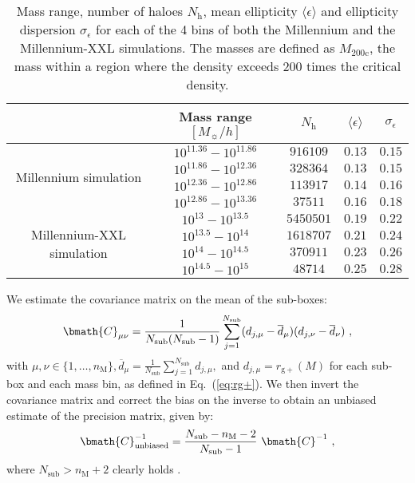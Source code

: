 \documentclass[a4paper,fleqn,usenatbib]{mnras}
\begin{document}
\begin{table}
	\centering
	\caption{Mass range, number of haloes $N_\mathrm{h}$, mean ellipticity $\langle \epsilon \rangle$ and ellipticity dispersion $\sigma_{\epsilon}$ for each of the 4 bins of both the Millennium and the Millennium-XXL simulations. The masses are defined as $M_{200\mathrm{c}}$, the mass within a region where the density exceeds 200 times the critical density.}
	\label{tab:bins}
	\tabcolsep=0.09cm
	\begin{tabular}{c||cccc} %
		\hline \hline
		\ & Mass range $[M_{\sun}/h]$ & $N_\mathrm{h}$ & $\langle \epsilon \rangle$ &  $\sigma_{\epsilon}$  \\
		\hline
		\multirow{4}{*}{Millennium simulation} & $10^{11.36}-10^{11.86}$ & $916109$ &$0.13$& $0.15$  \\ \ & $10^{11.86}-10^{12.36}$ & $328364$ &$0.13$& $0.15$  \\ \ & $10^{12.36}-10^{12.86}$ & $113917$ &$0.14$& $0.16$ \\ \ & $10^{12.86}-10^{13.36}$ & $37511$ &$0.16$& $0.18$ \\
		\hline 
		\multirow{4}{*}{Millennium-XXL simulation} & $10^{13}-10^{13.5}$ & $5450501$ &$0.19$& $0.22$  \\ \ & $10^{13.5}-10^{14}$ & $1618707$ &$0.21$& $0.24$  \\ \ & $10^{14}-10^{14.5}$ & $370911$ &$0.23$& $0.26$ \\ \ & $10^{14.5}-10^{15}$ & $48714$ &$0.25$& $0.28$ \\
		\hline \hline 
		\end{tabular}
\end{table}

We estimate the covariance matrix on the mean of the sub-boxes:
\begin{equation}
     \bmath{C}_{\mu \nu} = \frac{1}{N_\mathrm{sub}(N_\mathrm{sub}-1)} \sum_{j = 1}^{N_\mathrm{sub}} (d_{j, \mu} - \overline{d}_{\mu})(d_{j, \nu} - \overline{d}_{\nu}) \ ,
	\label{eq:covariance}
\end{equation}
with $\mu, \nu \in \{1, \dotso, n_\mathrm{M}\}, \overline{d}_{\mu} = \frac{1}{N_\mathrm{sub}} \sum_{j=1}^{N_\mathrm{sub}} d_{j, \mu},$ and $d_{j, \mu}= r_{\mathrm{g+}}(M)$ for each sub-box and each mass bin, as defined in Eq.~(\ref{eq:rg+}). We then invert the covariance matrix and correct the bias on the inverse to obtain an unbiased estimate of the precision matrix, given by:
\begin{equation}
     \bmath{C}^{-1}_{\mathrm{unbiased}} = \frac{N_\mathrm{sub} - n_\mathrm{M} -2}{N_\mathrm{sub}-1} \  \bmath{C}^{-1} \ ,
	\label{eq:precunbiased}
\end{equation}
where $N_\mathrm{sub} > n_\mathrm{M}+2$ clearly holds \citep{Kaufman1967, Hartlapetal2007, Tayloretal2013}.
\end{document}
